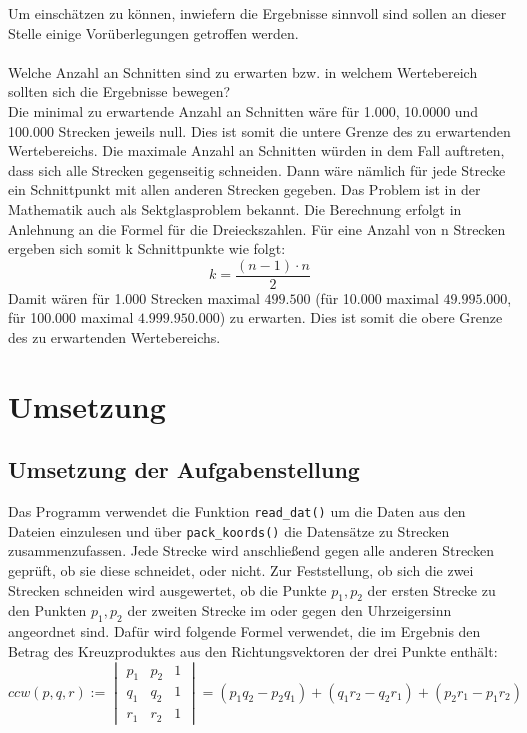 \documentclass[12pt]{scrartcl}
\newcommand{\code}[1]{\texttt{#1}}
\begin{document}
Um einschätzen zu können, inwiefern die Ergebnisse sinnvoll sind sollen an dieser Stelle einige Vorüberlegungen getroffen werden.\\~\\
Welche Anzahl an Schnitten sind zu erwarten bzw. in welchem Wertebereich sollten sich die Ergebnisse bewegen?\\
Die minimal zu erwartende Anzahl an Schnitten wäre für 1.000, 10.0000 und 100.000 Strecken jeweils null.
Dies ist somit die untere Grenze des zu erwartenden Wertebereichs.
Die maximale Anzahl an Schnitten würden in dem Fall auftreten, dass sich alle Strecken gegenseitig schneiden.
Dann wäre nämlich für jede Strecke ein Schnittpunkt mit allen anderen Strecken gegeben.
Das Problem ist in der Mathematik auch als Sektglasproblem bekannt.
Die Berechnung erfolgt in Anlehnung an die Formel für die Dreieckszahlen.
Für eine Anzahl von n Strecken ergeben sich somit k Schnittpunkte wie folgt:
\begin{equation}
k = \frac{(n-1) \cdot n}{2}
\end{equation}
Damit wären für 1.000 Strecken maximal $499.500$ (für 10.000 maximal $49.995.000$,
für 100.000 maximal $4.999.950.000$) zu erwarten.
Dies ist somit die obere Grenze des zu erwartenden Wertebereichs.

\section{Umsetzung}

\subsection{Umsetzung der Aufgabenstellung}

Das Programm verwendet die Funktion \code{read\_dat()} um die Daten aus den Dateien einzulesen und über \code{pack\_koords()} die Datensätze zu Strecken zusammenzufassen.
Jede Strecke wird anschließend gegen alle anderen Strecken geprüft, ob sie diese schneidet, oder nicht.
Zur Feststellung, ob sich die zwei Strecken schneiden wird ausgewertet, ob die Punkte $p_1, p_2$ der ersten Strecke zu den Punkten $p_1, p_2$ der zweiten Strecke im oder gegen den Uhrzeigersinn angeordnet sind.
Dafür wird folgende Formel verwendet, die im Ergebnis den Betrag des Kreuzproduktes aus den Richtungsvektoren der drei Punkte enthält:
\begin{equation}
    ccw(p, q, r) := \begin{vmatrix} p_1 & p_2 & 1 \\ q_1 & q_2 & 1 \\ r_1 & r_2 & 1 \end{vmatrix} = (p_1q_2 - p_2q_1) + (q_1r_2 - q_2r_1) + (p_2r_1 - p_1r_2)
\end{equation}
\end{document}
